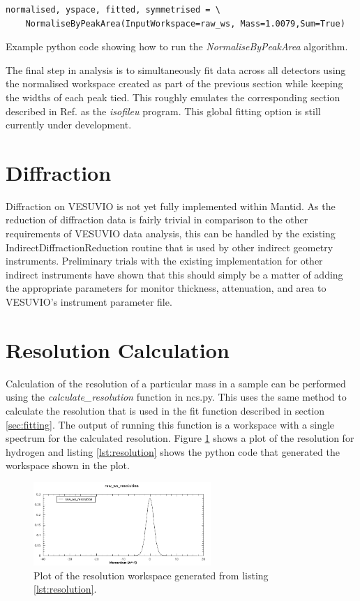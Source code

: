 \documentclass[paper=a4, fontsize=11pt]{scrartcl}	%
\numberwithin{equation}{section}															%
\numberwithin{figure}{section}																%
\numberwithin{table}{section}
\begin{document}
\begin{listing}[H]
\begin{verbatim}
normalised, yspace, fitted, symmetrised = \
	NormaliseByPeakArea(InputWorkspace=raw_ws, Mass=1.0079,Sum=True)
\end{verbatim}
\caption{Example python code showing how to run the \textit{NormaliseByPeakArea} algorithm.}
\label{lst:plot-angle}
\end{listing}

The final step in analysis is to simultaneously fit data across all detectors using the normalised workspace created as part of the previous section while keeping the widths of each peak tied. This roughly emulates the corresponding section described in Ref. \cite{mayers2010user} as the \textit{isofileu} program. This global fitting option is still currently under development.


\section{Diffraction}
\label{sec:diffraction}
Diffraction on VESUVIO is not yet fully implemented within Mantid. As the reduction of diffraction data is fairly trivial in comparison to the other requirements of VESUVIO data analysis, this can be handled by the existing IndirectDiffractionReduction routine that is used by other indirect geometry instruments. Preliminary trials with the existing implementation for other indirect instruments have shown that this should simply be a matter of adding the appropriate parameters for monitor thickness, attenuation, and area to VESUVIO's instrument parameter file.

\section{Resolution Calculation}
Calculation of the resolution of a particular mass in a sample can be performed using the \textit{calculate\_resolution} function in ncs.py. This uses the same method to calculate the resolution that is used in the fit function described in section \ref{sec:fitting}. The output of running this function is a workspace with a single spectrum for the calculated resolution. Figure \ref{fig:resolution} shows a plot of the resolution for hydrogen and listing \ref{lst:resolution} shows the python code that generated the workspace shown in the plot.

\begin{figure}[H]
\centering
\includegraphics[width=0.6\textwidth]{img/resolution.png}
\caption{Plot of the resolution workspace generated from listing \ref{lst:resolution}.}
\label{fig:resolution}
\end{figure}
\end{document}
